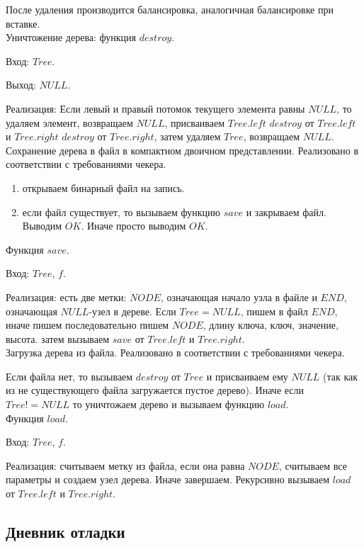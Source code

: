 \documentclass[12pt]{article}
\begin{document}
	После удаления производится балансировка, аналогичная балансировке при вставке. \\[1mm]
	
	Уничтожение дерева: функция $destroy$.
	
	Вход: $Tree$.
	
	Выход: $NULL$.
	
	Реализация: Если левый и правый потомок текущего элемента равны $NULL$, то удаляем элемент, возвращаем $NULL$, присваиваем $Tree.left$ $destroy$ от $Tree.left$ и $Tree.right$ $destroy$ от $Tree.right$, затем удаляем $Tree$, возвращаем $NULL$. \\[1mm]
	
	Сохранение дерева в файл в компактном двоичном представлении. Реализовано в соответствии с требованиями чекера.
	
	\begin{enumerate}
		\item открываем бинарный файл на запись.
		\item если файл существует, то вызываем функцию $save$ и закрываем файл. Выводим $OK$. Иначе просто выводим $OK$.
	\end{enumerate}

	Функция $save$.
	
	Вход: $Tree$, $f$.
	
	Реализация: есть две метки: $NODE$, означающая начало узла в файле и $END$, означающая $NULL$-узел в дереве. Если $Tree = NULL$, пишем в файл $END$, иначе пишем последовательно пишем $NODE$, длину ключа, ключ, значение, высота. затем вызываем $save$ от $Tree.left$ и $Tree.right$. \\[1mm]
	
	Загрузка дерева из файла. Реализовано в соответствии с требованиями чекера.
	
	Если файла нет, то вызываем $destroy$ от $Tree$ и присваиваем ему $NULL$ (так как из не существующего файла загружается пустое дерево). Иначе если $Tree != NULL$ то уничтожаем дерево и вызываем функцию $load$. \\[1mm]
	
	Функция $load$.
	
	Вход: $Tree$, $f$.
	
	Реализация: считываем метку из файла, если она равна $NODE$, считываем все параметры и создаем узел дерева. Иначе завершаем. Рекурсивно вызываем $load$ от $Tree.left$ и $Tree.right$.
			
	\subsection*{Дневник отладки}
	
\end{document}
